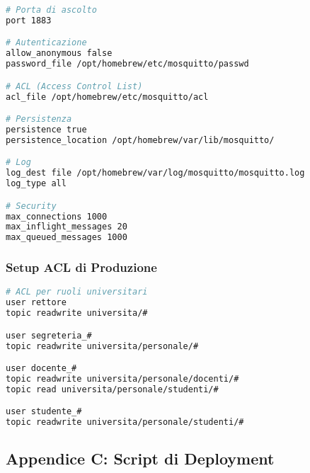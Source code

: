 \documentclass[12pt,a4paper]{article}
\begin{document}
\begin{lstlisting}[language=bash, caption=mosquitto.conf Avanzato]
# Porta di ascolto
port 1883

# Autenticazione
allow_anonymous false
password_file /opt/homebrew/etc/mosquitto/passwd

# ACL (Access Control List)
acl_file /opt/homebrew/etc/mosquitto/acl

# Persistenza
persistence true
persistence_location /opt/homebrew/var/lib/mosquitto/

# Log
log_dest file /opt/homebrew/var/log/mosquitto/mosquitto.log
log_type all

# Security
max_connections 1000
max_inflight_messages 20
max_queued_messages 1000
\end{lstlisting}

\subsubsection{Setup ACL di Produzione}
\begin{lstlisting}[language=bash, caption=File ACL Esempio]
# ACL per ruoli universitari
user rettore
topic readwrite universita/#

user segreteria_#
topic readwrite universita/personale/#

user docente_#
topic readwrite universita/personale/docenti/#
topic read universita/personale/studenti/#

user studente_#
topic readwrite universita/personale/studenti/#
\end{lstlisting}

\subsection{Appendice C: Script di Deployment}
\end{document}
